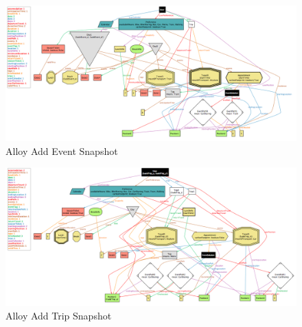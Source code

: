 \begin{figure}[H]
	\centering
	\includegraphics[scale=0.35]{Images/Alloy/Add_Event}
	\caption{Alloy Add Event Snapshot}
\end{figure}

\newpage
{}
\begin{figure}[H]
	\centering
	\includegraphics[scale=0.35]{Images/Alloy/Add_Trip}
	\caption{Alloy Add Trip Snapshot}
\end{figure}